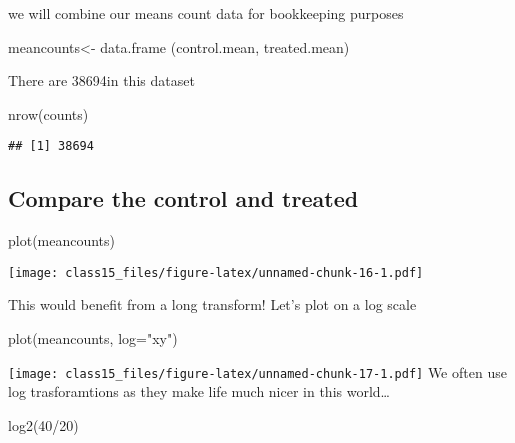 \documentclass[
]{article}
\newenvironment{Shaded}{\begin{snugshade}}{\end{snugshade}}
\newcommand{\AttributeTok}[1]{\textcolor[rgb]{0.77,0.63,0.00}{#1}}
\newcommand{\DecValTok}[1]{\textcolor[rgb]{0.00,0.00,0.81}{#1}}
\newcommand{\FunctionTok}[1]{\textcolor[rgb]{0.00,0.00,0.00}{#1}}
\newcommand{\NormalTok}[1]{#1}
\newcommand{\OtherTok}[1]{\textcolor[rgb]{0.56,0.35,0.01}{#1}}
\newcommand{\SpecialCharTok}[1]{\textcolor[rgb]{0.00,0.00,0.00}{#1}}
\newcommand{\StringTok}[1]{\textcolor[rgb]{0.31,0.60,0.02}{#1}}
\begin{document}
we will combine our means count data for bookkeeping purposes

\begin{Shaded}
\begin{Highlighting}[]
\NormalTok{meancounts}\OtherTok{\textless{}{-}}  \FunctionTok{data.frame}\NormalTok{ (control.mean, treated.mean)}
\end{Highlighting}
\end{Shaded}

There are 38694in this dataset

\begin{Shaded}
\begin{Highlighting}[]
\FunctionTok{nrow}\NormalTok{(counts)}
\end{Highlighting}
\end{Shaded}

\begin{verbatim}
## [1] 38694
\end{verbatim}

\hypertarget{compare-the-control-and-treated}{%
\subsection{Compare the control and
treated}\label{compare-the-control-and-treated}}

\begin{Shaded}
\begin{Highlighting}[]
\FunctionTok{plot}\NormalTok{(meancounts)}
\end{Highlighting}
\end{Shaded}

\texttt{[image: class15\_files/figure-latex/unnamed-chunk-16-1.pdf]}

This would benefit from a long transform! Let's plot on a log scale

\begin{Shaded}
\begin{Highlighting}[]
\FunctionTok{plot}\NormalTok{(meancounts, }\AttributeTok{log=}\StringTok{"xy"}\NormalTok{)}
\end{Highlighting}
\end{Shaded}

\texttt{[image: class15\_files/figure-latex/unnamed-chunk-17-1.pdf]} We
often use log trasforamtions as they make life much nicer in this
world\ldots{}

\begin{Shaded}
\begin{Highlighting}[]
\FunctionTok{log2}\NormalTok{(}\DecValTok{40}\SpecialCharTok{/}\DecValTok{20}\NormalTok{)}
\end{Highlighting}
\end{Shaded}
\end{document}
